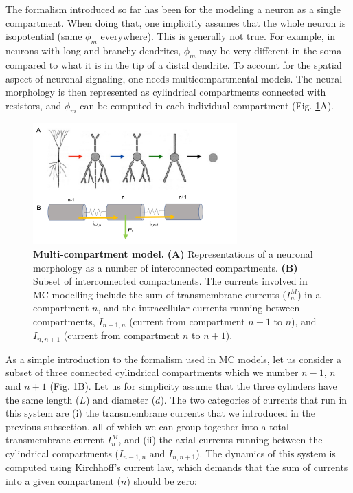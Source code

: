 \section{}
\label{sec:Neuron:morphology}
The formalism introduced so far has been for the modeling a neuron as a single compartment. When doing that, one implicitly assumes that the whole neuron is isopotential (same $\phi_m$ everywhere). This is generally not true. For example, in neurons with long and branchy dendrites, $\phi_m$ may be very different in the soma compared to what it is in the tip of a distal dendrite. To account for the spatial aspect of neuronal signaling, one needs multicompartmental models. The neural morphology is then represented as cylindrical compartments connected with resistors, and $\phi_m$ can be computed in each individual compartment  (Fig. \ref{Neuron:fig:multikompisen}A). 

\begin{figure}[!ht]
\begin{center}
\includegraphics[width=0.7\textwidth]{Figures/Neuron/Multikompis.png}
\end{center}
\caption{\textbf{Multi-compartment model.} {\bf (A)} Representations of a neuronal morphology as a number of interconnected compartments. {\bf (B)} Subset of interconnected compartments. The currents involved in MC modelling include the sum of transmembrane currents ($I^M_n$) in a compartment $n$, and the intracellular currents running between 
compartments, $I_{n-1,n}$ (current from compartment $n-1$ to $n$), and $I_{n,n+1}$ (current from compartment $n$ to $n+1$).}
\label{Neuron:fig:multikompisen}
\end{figure}

As a simple introduction to the formalism used in MC models, let us consider a subset of three connected cylindrical compartments which we number $n-1$, $n$ and $n+1$ (Fig. \ref{Neuron:fig:multikompisen}B). Let us for simplicity assume that the three cylinders have the same length ($L$) and diameter ($d$). The two categories of currents that run in this system are (i) the transmembrane currents that we introduced in the previous subsection, all of which we can group together into a total transmembrane current $I^M_n$, and (ii) the axial currents running between the cylindrical compartments ($I_{n-1,n}$ and $I_{n,n+1}$). The dynamics of this system is computed using Kirchhoff's current law, which demands that the sum of currents into a given compartment ($n$) should be zero:

